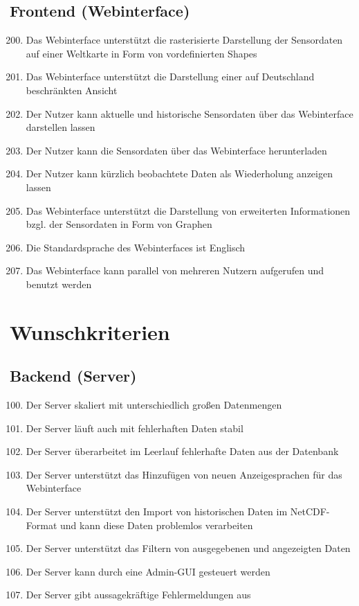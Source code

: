\subsection{Frontend (Webinterface)}
\begin{enumerate}[label=\textbf{MK\arabic{enumi}0}]
	\setcounter{enumi}{199}
	\item Das Webinterface unterstützt die rasterisierte Darstellung der Sensordaten auf einer Weltkarte in Form von vordefinierten Shapes
	\item Das Webinterface unterstützt die Darstellung einer auf Deutschland beschränkten Ansicht
	\item Der Nutzer kann aktuelle und historische Sensordaten über das Webinterface darstellen lassen
	\item Der Nutzer kann die Sensordaten über das Webinterface herunterladen
	\item Der Nutzer kann kürzlich beobachtete Daten als Wiederholung anzeigen lassen
	\item Das Webinterface unterstützt die Darstellung von erweiterten Informationen bzgl. der Sensordaten in Form von Graphen
	\item Die Standardsprache des Webinterfaces ist Englisch
	\item Das Webinterface kann parallel von mehreren Nutzern aufgerufen und benutzt werden
\end{enumerate}

\section{Wunschkriterien}
\subsection{Backend (Server)}
\begin{enumerate}[label=\textbf{WK\arabic{enumi}0}]
	\setcounter{enumi}{99}
	\item Der Server skaliert mit unterschiedlich großen Datenmengen %
	\item Der Server läuft auch mit fehlerhaften Daten stabil %
	\item Der Server überarbeitet im Leerlauf fehlerhafte Daten aus der Datenbank
	\item Der Server unterstützt das Hinzufügen von neuen Anzeigesprachen für das Webinterface
	\item Der Server unterstützt den Import von historischen Daten im NetCDF-Format und kann diese Daten problemlos verarbeiten %
	\item Der Server unterstützt das Filtern von ausgegebenen und angezeigten Daten
	\item Der Server kann durch eine Admin-GUI gesteuert werden%
	\item Der Server gibt aussagekräftige Fehlermeldungen aus %
\end{enumerate}
